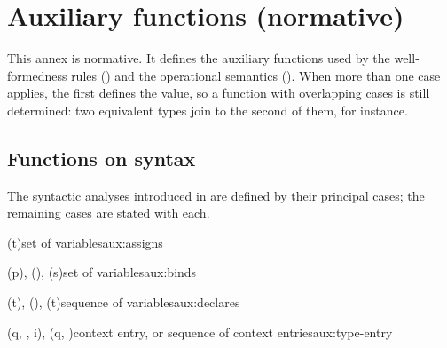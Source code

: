 \chapter{Auxiliary functions (normative)}
\label{ch:auxiliary-functions}

This annex is normative. It defines the auxiliary functions used by the well-formedness rules
() and the operational semantics (). When more than one
case applies, the first defines the value, so a function with overlapping cases is still determined: two
equivalent types join to the second of them, for instance.

\section{Functions on syntax}
\label{sec:auxiliary-syntactic}

The syntactic analyses introduced in  are defined by their principal cases; the remaining
cases are stated with each.

\begin{auxfunction}{\assignsS(t)}{set of variables}{aux:assigns}

\end{auxfunction}

\begin{auxfunction}{\binds(p), \binds(), \binds(s)}{set of variables}{aux:binds}

\end{auxfunction}

\begin{auxfunction}{\declaresS(t), \declaresS(\seq{\iota}), \declaresS(\seq{\iota}\;t)}{sequence of variables}{aux:declares}

\end{auxfunction}

\begin{auxfunction}{\typeEntry{\Gamma}(q, \seq{\chi}, i), \typeEntry{\Gamma}(q, \seq{\chi})}{context entry, or sequence of context entries}{aux:type-entry}

\vspace{-\baselineskip}
\end{auxfunction}

